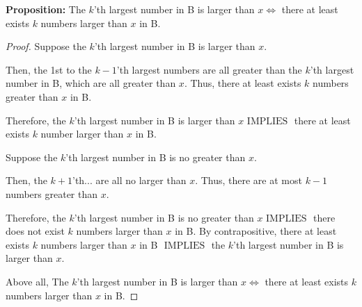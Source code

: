 \documentclass[10pt]{article}
\newcommand{\iimplies}{\mbox{ IMPLIES }}
\begin{document}
\begin{enumerate}
\begin{addmargin}[1em]{0em}
    \textbf{Proposition:} The $k$'th largest number in B is larger than $x
    \iff$ there at least exists $k$ numbers larger than $x$ in B.
    
    \begin{proof}
        Suppose the $k$'th largest number in B is larger than $x$.
        \begin{addmargin}[1em]{0em}
            Then, the 1st to the $k-1$'th largest numbers are all greater than
            the $k$'th largest number in B, which are all greater than $x$.
            Thus, there at least exists $k$ numbers greater than $x$ in B.
        \end{addmargin}
        Therefore, the $k$'th largest number in B is larger than $x \iimplies$
        there at least exists $k$ number larger than $x$ in B.

        Suppose the $k$'th largest number in B is no greater than $x$.
        \begin{addmargin}[1em]{0em}
            Then, the $k+1$'th... are all no larger than $x$.
            Thus, there are at most $k-1$ numbers greater than $x$.
        \end{addmargin}
        Therefore, the $k$'th largest number in B is no greater than $x
        \iimplies$ there does not exist $k$ numbers larger than $x$ in B.
        By contrapositive, there at least exists $k$ numbers larger than $x$ in
        B $\iimplies$ the $k$'th largest number in B is larger than $x$.

        Above all, The $k$'th largest number in B is larger than $x \iff$ there
        at least exists $k$ numbers larger than $x$ in B.
    \end{proof}
\end{addmargin}


\end{enumerate}
\end{document}
